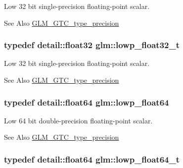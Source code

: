Low 32 bit single-\/precision floating-\/point scalar. \begin{DoxySeeAlso}{See Also}
\hyperlink{group__gtc__type__precision}{G\-L\-M\-\_\-\-G\-T\-C\-\_\-type\-\_\-precision} 
\end{DoxySeeAlso}
\hypertarget{group__gtc__type__precision_gadfb453b23cb820e3e4e766e047c67dab}{
\subsubsection[{lowp\-\_\-float32\-\_\-t}]{\setlength{\rightskip}{0pt plus 5cm}typedef detail\-::float32 {\bf glm\-::lowp\-\_\-float32\-\_\-t}}}\label{group__gtc__type__precision_gadfb453b23cb820e3e4e766e047c67dab}
Low 32 bit single-\/precision floating-\/point scalar. \begin{DoxySeeAlso}{See Also}
\hyperlink{group__gtc__type__precision}{G\-L\-M\-\_\-\-G\-T\-C\-\_\-type\-\_\-precision} 
\end{DoxySeeAlso}
\hypertarget{group__gtc__type__precision_ga32e02689f4e83fb269c9047418536f2c}{
\subsubsection[{lowp\-\_\-float64}]{\setlength{\rightskip}{0pt plus 5cm}typedef detail\-::float64 {\bf glm\-::lowp\-\_\-float64}}}\label{group__gtc__type__precision_ga32e02689f4e83fb269c9047418536f2c}
Low 64 bit double-\/precision floating-\/point scalar. \begin{DoxySeeAlso}{See Also}
\hyperlink{group__gtc__type__precision}{G\-L\-M\-\_\-\-G\-T\-C\-\_\-type\-\_\-precision} 
\end{DoxySeeAlso}
\hypertarget{group__gtc__type__precision_gac9d64f4e69d6c2eade41a848077866b5}{
\subsubsection[{lowp\-\_\-float64\-\_\-t}]{\setlength{\rightskip}{0pt plus 5cm}typedef detail\-::float64 {\bf glm\-::lowp\-\_\-float64\-\_\-t}}}\label{group__gtc__type__precision_gac9d64f4e69d6c2eade41a848077866b5}
